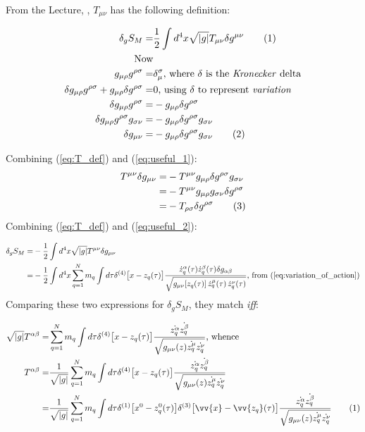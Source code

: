 \documentclass[]{article}
\newcommand\numberthis{\addtocounter{equation}{1}\tag{\theequation}}
\begin{document}
From the Lecture, \cite[(73)]{akhmedev2016}, $T_{\mu\nu}$ has the following definition:

\begin{align*}
\delta_g S_M =& \frac{1}{2} \int d^4 x \sqrt{|g|} T_{\mu\nu} \delta g^{\mu\nu} \numberthis \label {eq:T_def} \\
\text{Now}&\\
g_{\mu\rho}g^{\rho\sigma} =& \delta_{\mu}^{\sigma} \text{, where $\delta$ is the \emph{Kronecker} delta}\\
\delta g_{\mu\rho}g^{\rho\sigma} + g_{\mu\rho}\delta g^{\rho\sigma} =& 0 \text{, using $\delta$ to represent \emph{variation}}\\
\delta g_{\mu\rho}g^{\rho\sigma} =& - g_{\mu\rho}\delta g^{\rho\sigma}\\
\delta g_{\mu\rho}g^{\rho\sigma} g_{\sigma\nu} =& - g_{\mu\rho}\delta g^{\rho\sigma} g_{\sigma\nu} \\
\delta g_{\mu\nu} =& - g_{\mu\rho}\delta g^{\rho\sigma} g_{\sigma\nu} \numberthis \label {eq:useful_1}
\end{align*}

Combining (\ref{eq:T_def}) and (\ref{eq:useful_1}):
\begin{align*}
T^{\mu\nu}\delta g_{\mu\nu} =& - T^{\mu\nu} g_{\mu\rho}\delta g^{\rho\sigma} g_{\sigma\nu}\\
=& - T^{\mu\nu} g_{\mu\rho} g_{\sigma\nu} \delta g^{\rho\sigma}\\
=& -T_{\rho\sigma}\delta g^{\rho\sigma} \numberthis \label {eq:useful_2}
\end{align*}
Combining (\ref{eq:T_def}) and (\ref{eq:useful_2}):

\begin{align*}
\delta_g S_M =& - \frac{1}{2} \int d^4 x \sqrt{|g|} T^{\mu\nu} \delta g_{\mu\nu}\\
=& - \frac{1}{2} \int d^4 x \sum_{q=1}^N m_q \int d \tau \delta^{(4)} \big[x - z_q(\tau)\big] \frac{ \dot{z}_q^\alpha(\tau) \dot{z}_q^\beta(\tau) \delta g_{\alpha\beta}}{ \sqrt{g_{\mu\nu}[z_q(\tau)] \, \dot{z}_q^\mu(\tau)\, \dot{z}_q^\nu(\tau)}} \text{, from (\ref{eq:variation_of_action})}
\end{align*}
Comparing these two expressions for $\delta_g S_M$, they match \emph{iff}:

\begin{align*}
\sqrt{|g|} T^{\alpha\beta} =&  \sum_{q=1}^{N} m_q \int d\tau \delta^{(4)} \big[x-z_q(\tau)\big]\frac{\dot{z_q^\alpha} \dot{z_q^\beta}}{\sqrt{g_{\mu\nu}(z)\dot{z_q^\mu}\dot{z_q^\nu}}} \text{, whence} \\
T^{\alpha\beta} =& \frac{1}{\sqrt{|g|}} \sum_{q=1}^{N} m_q \int d\tau \delta^{(4)} \big[x-z_q(\tau)\big]\frac{\dot{z_q^\alpha} \dot{z_q^\beta}}{\sqrt{g_{\mu\nu}(z)\dot{z_q^\mu}\dot{z_q^\nu}}} \\
=& \frac{1}{\sqrt{|g|}} \sum_{q=1}^{N} m_q \int d\tau \delta^{(1)} \big[x^0-z^0_q(\tau)\big]\delta^{(3)} \big[\vv{x}-\vv{z_q}(\tau)\big]\frac{\dot{z_q^\alpha} \dot{z_q^\beta}}{\sqrt{g_{\mu\nu}(z)\dot{z_q^\mu}\dot{z_q^\nu}}} \numberthis \label{eq:T_penult}
\end{align*}
\end{document}
